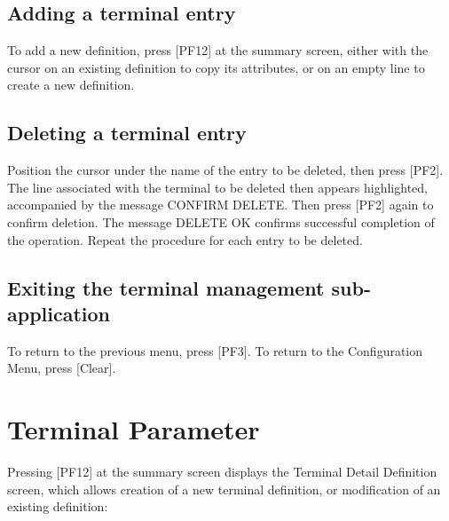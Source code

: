 \documentclass[letterpaper,10pt,english]{sphinxmanual}
\begin{document}
\subsection{Adding a terminal entry}
\label{\detokenize{connectivity_guide:adding-a-terminal-entry}}
To add a new definition, press {[}PF12{]} at the summary screen, either with the cursor on an existing definition to copy its attributes, or on an empty line to create a new definition.


\subsection{Deleting a terminal entry}
\label{\detokenize{connectivity_guide:deleting-a-terminal-entry}}
Position the cursor under the name of the entry to be deleted, then press {[}PF2{]}. The line associated with the terminal to be deleted then appears highlighted, accompanied by the message CONFIRM DELETE. Then press {[}PF2{]} again to confirm deletion. The message DELETE OK confirms successful completion of the operation. Repeat the procedure for each entry to be deleted.


\subsection{Exiting the terminal management sub-application}
\label{\detokenize{connectivity_guide:exiting-the-terminal-management-sub-application}}
To return to the previous menu, press {[}PF3{]}. To return to the Configuration Menu, press {[}Clear{]}.


\section{Terminal Parameter}
\label{\detokenize{connectivity_guide:terminal-parameter}}
Pressing {[}PF12{]} at the summary screen displays the Terminal Detail Definition screen, which allows creation of a new terminal definition, or modification of an existing definition:

\end{document}

